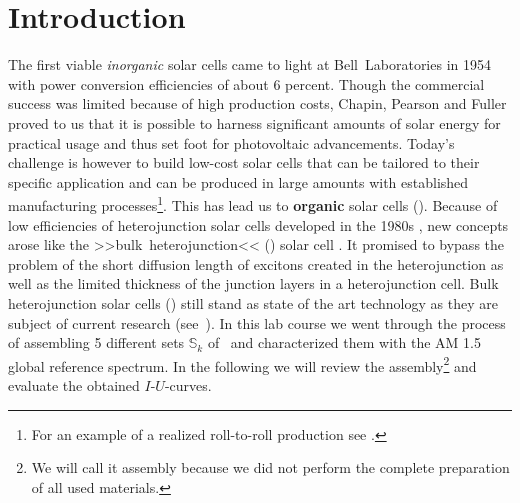 
\section*{Introduction}%

The first viable \textit{inorganic} solar cells came to light at Bell~Laboratories in 1954 \cite{siliconSC_1}\cite{siliconSC_2} with power conversion efficiencies of about 6 percent. Though the commercial success was limited because of high production costs, Chapin, Pearson and Fuller proved to us that it is possible to harness significant amounts of solar energy for practical usage and thus set foot for photovoltaic advancements.\mypar
Today's challenge is however to build low-cost solar cells that can be tailored to their specific application and can be produced in large amounts with established manufacturing processes\footnote{For an example of a realized roll-to-roll production see \cite{rolltoroll}.}. This has lead us to \textbf{organic} solar cells (\OSC).\mypar
Because of low efficiencies of heterojunction solar cells developed in the 1980s \cite{tang}, new concepts arose like the >>bulk~heterojunction<< (\BHJ) solar cell \cite{heterojunk}. It promised to bypass the problem of the short diffusion length of excitons created in the heterojunction as well as the limited thickness of the junction layers in a heterojunction cell.\mypar
Bulk heterojunction solar cells (\BHSC) still stand as state of the art technology as they are subject of current research (see~\cite{modernbulkhetero}). In this lab course we went through the process of assembling 5 different sets $\mathbb{S}_k$ of \BHSC\ and characterized them with the {\os\sefo AM 1.5} global reference spectrum. In the following we will review the assembly\footnote{We will call it assembly because we did not perform the complete preparation of all used materials.} and evaluate the obtained $I$-$U$-curves.

